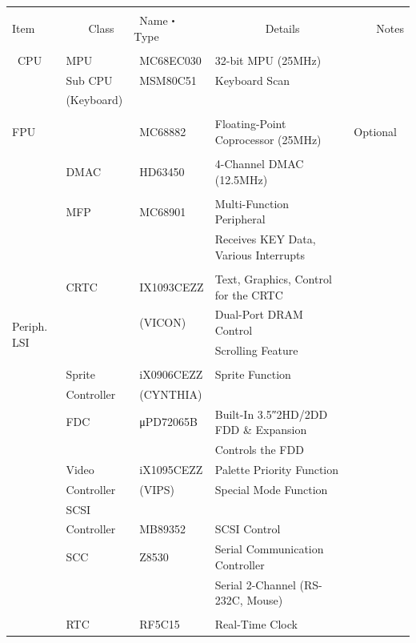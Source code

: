 \documentclass[twoside,a4paper,12pt]{article}
\begin{document}
\setlength{\tabcolsep}{0.5mm}
\begin{tabular}{|p{13mm}|p{25mm}|p{22mm}|p{73mm}|p{30mm}|}
\hline
& & & &\\[-2mm]
Item & \ \ \ \ Class & \ Name・Type & \ \ \ \ \ \ \ \ \ Details & \ \ \ \ Notes\\
\hline
& & & &\\[-3mm]
\ CPU & MPU & \ MC68EC030 & 32-bit MPU (25MHz) &\\
& Sub CPU & \ MSM80C51 & Keyboard Scan &\\
& (Keyboard) & & &\\
\hline
\multicolumn{2}{|l|}{} & & &\\[-4mm]
\multicolumn{2}{|l|}{FPU} & \ MC68882 & Floating-Point Coprocessor (25MHz) & Optional\\
\hline
\multirow{17}{13mm}{Periph. LSI} & & & &\\[-3mm]
& DMAC & \ HD63450 & 4-Channel DMAC (12.5MHz) &\\
\cline{2-5}
& & & &\\[-3mm]
& MFP & \ MC68901 & Multi-Function Peripheral &\\
& & & Receives KEY Data, Various Interrupts &\\
\cline{2-5}
& & & &\\[-3mm]
& CRTC & \ IX1093CEZZ & Text, Graphics, Control for the CRTC &\\
& & \ (VICON) & Dual-Port DRAM Control &\\
& & & Scrolling Feature &\\[3mm]
\cline{2-5}
& & & &\\[-1mm]
& Sprite & \ iX0906CEZZ & Sprite Function &\\
& Controller & \ (CYNTHIA) & &\\
& FDC & \ μPD72065B & Built-In 3.5″2HD/2DD FDD \& Expansion &\\
& & & Controls the FDD &\\
& Video & \ iX1095CEZZ & Palette Priority Function &\\
& Controller & \ (VIPS) & Special Mode Function &\\
& SCSI & & &\\
& Controller & \ MB89352 & SCSI Control &\\
& SCC & \ Z8530 & Serial Communication Controller &\\
& & & Serial 2-Channel (RS-232C, Mouse) &\\
& & & &\\
& RTC & \ RF5C15 & Real-Time Clock &\\

\end{tabular}
\end{document}
